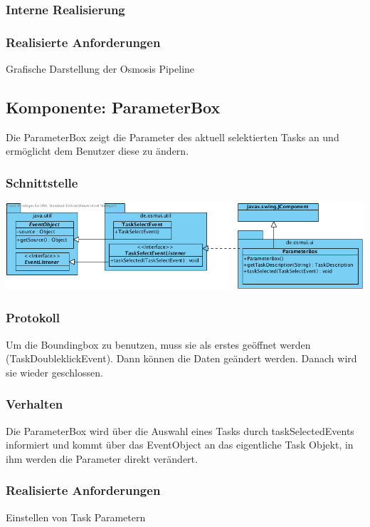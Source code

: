 \documentclass[a4paper,12pt]{scrartcl}
\begin{document}
\subsubsection{Interne Realisierung}
\subsubsection{Realisierte Anforderungen}
Grafische Darstellung der Osmosis Pipeline

\subsection{Komponente: ParameterBox}
Die ParameterBox zeigt die Parameter des aktuell selektierten Tasks an und ermöglicht dem Benutzer diese zu ändern. 
\subsubsection{Schnittstelle}
\begin{center}
\includegraphics[width=17cm]{Schnittstelle_ParameterBox.png}
\end{center}
\subsubsection{Protokoll}
Um die Boundingbox zu benutzen, muss sie als erstes geöffnet werden (TaskDoubleklickEvent). Dann können die Daten geändert werden. Danach wird sie wieder geschlossen.
\subsubsection{Verhalten}
Die ParameterBox wird über die Auswahl eines Tasks durch taskSelectedEvents informiert und kommt über das EventObject an das eigentliche Task Objekt, in ihm werden die Parameter direkt verändert.
\subsubsection{Realisierte Anforderungen}
Einstellen von Task Parametern
\end{document}
